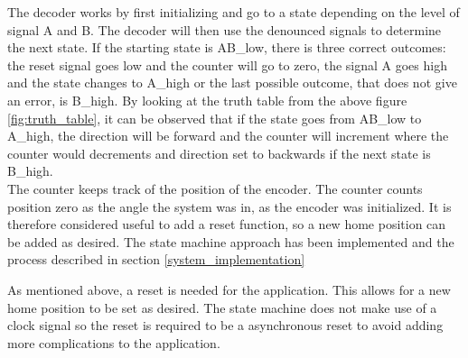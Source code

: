 \documentclass[../../../main]{subfiles}
\begin{document}
The decoder works by first initializing and go to a state depending on the level of signal A and B. The decoder will then use the denounced signals to determine the next state. If the starting state is AB\_low, there is three correct outcomes: the reset signal goes low and the counter will go to zero, the signal A goes high and the state changes to A\_high or the last possible outcome, that does not give an error, is B\_high. By looking at the truth table from the above figure \ref{fig:truth_table}, it can be observed that if the state goes from AB\_low to A\_high, the direction will be forward and the counter will increment where the counter would decrements and direction set to backwards if the next state is B\_high.\\
The counter keeps track of the position of the encoder. The counter counts position zero as the angle the system was in, as the encoder was initialized. It is therefore considered useful to add a reset function, so a new home position can be added as desired.  The state machine approach has been implemented and the process described in section \ref{system_implementation}

\begin{figure}[H]
  \centering
  \def\svgwidth{\columnwidth}
  \fontsize{9}{9}\selectfont
  
  \caption{}
\end{figure}
As mentioned above, a reset is needed for the application. This allows for a new home position to be set as desired. The state machine does not make use of a clock signal so the reset is required to be a asynchronous reset to avoid adding more complications to the application.
\end{document}
